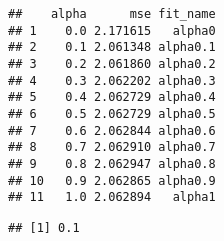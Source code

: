 \documentclass[
]{article}
\newenvironment{Shaded}{\begin{snugshade}}{\end{snugshade}}
\newcommand{\AttributeTok}[1]{\textcolor[rgb]{0.13,0.29,0.53}{#1}}
\newcommand{\CommentTok}[1]{\textcolor[rgb]{0.56,0.35,0.01}{\textit{#1}}}
\newcommand{\FunctionTok}[1]{\textcolor[rgb]{0.13,0.29,0.53}{\textbf{#1}}}
\newcommand{\NormalTok}[1]{#1}
\newcommand{\OtherTok}[1]{\textcolor[rgb]{0.56,0.35,0.01}{#1}}
\newcommand{\SpecialCharTok}[1]{\textcolor[rgb]{0.81,0.36,0.00}{\textbf{#1}}}
\begin{document}
\begin{verbatim}
##    alpha      mse fit_name
## 1    0.0 2.171615   alpha0
## 2    0.1 2.061348 alpha0.1
## 3    0.2 2.061860 alpha0.2
## 4    0.3 2.062202 alpha0.3
## 5    0.4 2.062729 alpha0.4
## 6    0.5 2.062729 alpha0.5
## 7    0.6 2.062844 alpha0.6
## 8    0.7 2.062910 alpha0.7
## 9    0.8 2.062947 alpha0.8
## 10   0.9 2.062865 alpha0.9
## 11   1.0 2.062894   alpha1
\end{verbatim}

\begin{Shaded}
\end{Shaded}

\begin{verbatim}
## [1] 0.1
\end{verbatim}
\end{document}

